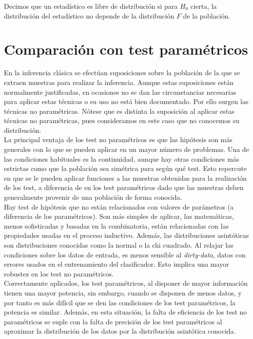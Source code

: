 \begin{definicion}
	Decimos que un estadístico es libre de distribución si 
para $H_0$ cierta, la distribución del estadístico no depende 
de la distribución $F$ de la población.
\end{definicion}
	
\section{Comparación con test paramétricos}
	
	En la inferencia clásica se efectúan suposiciones sobre 
la población de la que se extraen muestras para realizar la 
inferencia. Aunque estas suposiciones están normalmente 
justificadas, en ocasiones no se dan las circunstancias 
necesarias para aplicar estas técnicas o su uso no está bien 
documentado. Por ello surgen las técnicas no paramétricas. 
Nótese que es distinta la suposición al aplicar estas 
técnicas no paramétricas, pues consideramos en este caso que 
no conocemos su distribución.\\
	
 	La principal ventaja de los test no paramétricos es que  
las hipótesis son más generales con lo que se pueden aplicar 
en un mayor número de problemas. Una de las condiciones 
habituales es la continuidad, aunque hay otras condiciones 
más estrictas como que la población sea simétrica para según 
qué test. Esto repercute en que se le pueden aplicar 
funciones a las muestras obtenidas para la realización de los 
test, a diferencia de en los test paramétricos dado que las 
muestras deben generalmente provenir de una población de 
forma conocida.\\
 	
	Hay test de hipótesis que no están relacionados con 
valores de parámetros (a diferencia de los paramétricos). Son 
más simples de aplicar, las matemáticas, menos sofisticadas y 
basadas en la combinatoria, están relacionadas con las 
propiedades usadas en el proceso inductivo. 
Además, las distribuciones asintóticas son 
distribuciones conocidas como la normal o la chi cuadrado. Al 
relajar las condiciones sobre los datos de entrada, es menos 
sensible al \textit{dirty-data}, datos con errores usados en 
el entrenamiento del clasificador. Esto implica una mayor 
robustez en los test no paramétricos.\\
 	
	Correctamente aplicados, los test paramétricos, al 
disponer de mayor información tienen una mayor potencia, sin 
embargo, cuando se disponen de menos datos, y por tanto es 
más difícil que se den las condiciones de los test 
paramétricos, la potencia es similar. Además, en esta 
situación, la falta de eficiencia de los test no paramétricos 
se suple con la falta de precisión de los test paramétricos 
al aproximar la distribución de los datos por la distribución 
asintótica conocida. 



